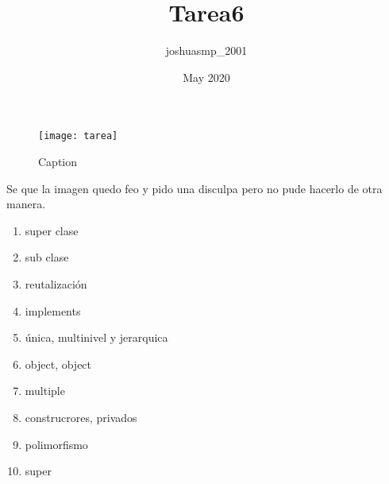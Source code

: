 \documentclass{article}
\title{Tarea6}
\author{joshuasmp_2001 }
\date{May 2020}
\begin{document}
\begin{figure}
    \centering
    \texttt{[image: tarea]}
    \caption{Caption}
    \label{fig:my_label}
\end{figure}



Se que la imagen quedo feo y pido una disculpa pero no pude hacerlo de otra manera.



\begin{enumerate}
\end{enumerate}
\begin{enumerate}
\item super clase 
\item sub clase
\item reutalización 
\item implements
\item única, multinivel y jerarquica 
\item object, object
\item multiple
\item construcrores, privados 
\item polimorfismo
\item super
\end{enumerate}
\end{document}
